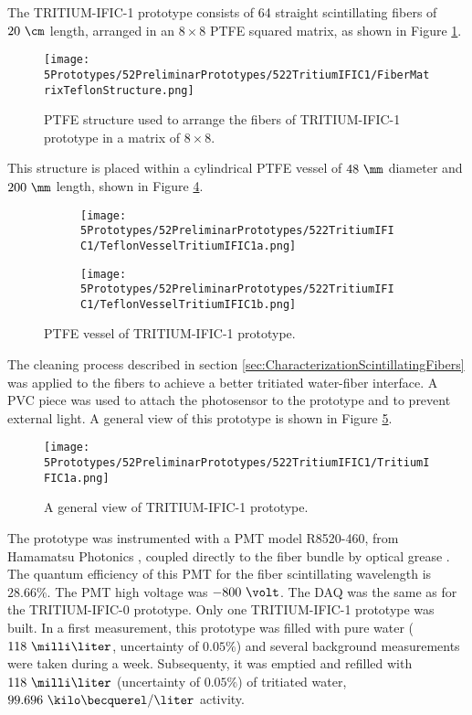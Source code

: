 The TRITIUM-IFIC-1 prototype consists of 64 straight scintillating fibers of $20~\cm$ length, arranged in an $8\times 8$ PTFE squared matrix, as shown in Figure \ref{fig:TeflonStructureFibersTritiumIFIC1}.
\begin{figure}[h]
\centering
\texttt{[image: 5Prototypes/52PreliminarPrototypes/522TritiumIFIC1/FiberMatrixTeflonStructure.png]}
\caption{PTFE structure used to arrange the fibers of TRITIUM-IFIC-1 prototype in a matrix of $8 \times 8$.\label{fig:TeflonStructureFibersTritiumIFIC1}}
\end{figure}
This structure is placed within a cylindrical PTFE vessel of $48~\mm$ diameter and $200~\mm$ length, shown in Figure \ref{fig:TeflonVesselTritumIFIC1}. 
\begin{figure}
\centering
    \begin{subfigure}[b]{0.30\textwidth}
    \centering
    \texttt{[image: 5Prototypes/52PreliminarPrototypes/522TritiumIFIC1/TeflonVesselTritiumIFIC1a.png]}  
    \caption{\label{subfig:TeflonVesselTritumIFIC1a}}
    \end{subfigure}
    \hfill
    \begin{subfigure}[b]{0.45\textwidth}
    \centering
    \texttt{[image: 5Prototypes/52PreliminarPrototypes/522TritiumIFIC1/TeflonVesselTritiumIFIC1b.png]}  
    \caption{\label{subfig:TeflonVesselTritumIFIC1b}}
    \end{subfigure}
 \caption{PTFE vessel of TRITIUM-IFIC-1 prototype.}
 \label{fig:TeflonVesselTritumIFIC1}
\end{figure}
The cleaning process described in section \ref{sec:CharacterizationScintillatingFibers} was applied to the fibers to achieve a better tritiated water-fiber interface. A PVC piece was used to attach the photosensor to the prototype and to prevent external light. A general view of this prototype is shown in Figure \ref{fig:TritumIFIC1}.

\begin{figure}[h]
\centering
\texttt{[image: 5Prototypes/52PreliminarPrototypes/522TritiumIFIC1/TritiumIFIC1a.png]}
\caption{A general view of TRITIUM-IFIC-1 prototype.\label{fig:TritumIFIC1}}
\end{figure}
The prototype was instrumented with a PMT model R8520-460, from Hamamatsu Photonics \cite{DataSheetPMTs}, coupled directly to the fiber bundle by optical grease \cite{OpticalGrease}. The quantum efficiency of this PMT for the fiber scintillating wavelength is $28.66\%$.  The PMT high voltage was $-800~\volt$. The DAQ was the same as for the TRITIUM-IFIC-0 prototype. Only one TRITIUM-IFIC-1 prototype was built. In a first measurement, this prototype was filled with pure water ($118~\milli\liter$, uncertainty of $0.05\%$) and several background measurements were taken during a week. Subsequenty, it was emptied and refilled with $118~\milli\liter$ (uncertainty of $0.05\%$) of tritiated water, $99.696~\kilo\becquerel/\liter$ activity. 

